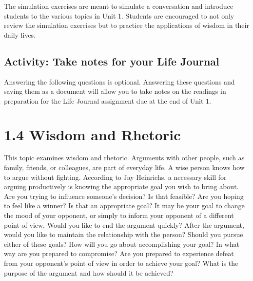 \documentclass[
]{book}
\begin{document}
\begin{reflect}
The simulation exercises are meant to simulate a conversation and introduce students to the various topics in Unit 1. Students are encouraged to not only review the simulation exercises but to practice the applications of wisdom in their daily lives.
\end{reflect}

\hypertarget{activity-take-notes-for-your-life-journal}{%
\subsection*{Activity: Take notes for your Life Journal}\label{activity-take-notes-for-your-life-journal}}

\begin{reflect}
Answering the following questions is optional. Answering these questions and saving them as a document will allow you to take notes on the readings in preparation for the Life Journal assignment due at the end of Unit 1.
\end{reflect}

\hypertarget{wisdom-and-rhetoric}{%
\section*{1.4 Wisdom and Rhetoric}\label{wisdom-and-rhetoric}}

This topic examines wisdom and rhetoric. Arguments with other people, such as family, friends, or colleagues, are part of everyday life. A wise person knows how to argue without fighting. According to Jay Heinrichs, a necessary skill for arguing productively is knowing the appropriate goal you wish to bring about. Are you trying to influence someone's decision? Is that feasible? Are you hoping to feel like a winner? Is that an appropriate goal? It may be your goal to change the mood of your opponent, or simply to inform your opponent of a different point of view. Would you like to end the argument quickly? After the argument, would you like to maintain the relationship with the person? Should you pursue either of these goals? How will you go about accomplishing your goal? In what way are you prepared to compromise? Are you prepared to experience defeat from your opponent's point of view in order to achieve your goal? What is the purpose of the argument and how should it be achieved?
\end{document}
